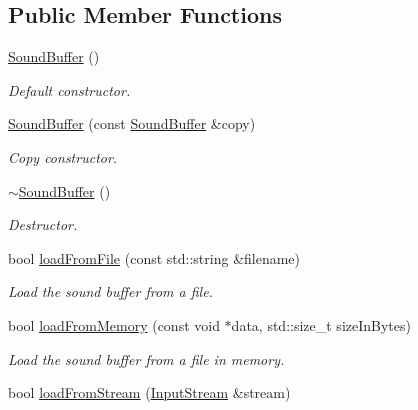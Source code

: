 \subsection*{Public Member Functions}
\begin{DoxyCompactItemize}
\item 
\mbox{\label{classsf_1_1_sound_buffer_a0cabfbfe19b831bf7d5c9592d92ef233}} 
\hyperlink{classsf_1_1_sound_buffer_a0cabfbfe19b831bf7d5c9592d92ef233}{Sound\+Buffer} ()
\begin{DoxyCompactList}\small\item\em Default constructor. \end{DoxyCompactList}\item 
\hyperlink{classsf_1_1_sound_buffer_aaf000fc741ff27015907e8588263f4a6}{Sound\+Buffer} (const \hyperlink{classsf_1_1_sound_buffer}{Sound\+Buffer} \&copy)
\begin{DoxyCompactList}\small\item\em Copy constructor. \end{DoxyCompactList}\item 
\mbox{\label{classsf_1_1_sound_buffer_aea240161724ffba74a0d6a9e277d3cd5}} 
\hyperlink{classsf_1_1_sound_buffer_aea240161724ffba74a0d6a9e277d3cd5}{$\sim$\+Sound\+Buffer} ()
\begin{DoxyCompactList}\small\item\em Destructor. \end{DoxyCompactList}\item 
bool \hyperlink{classsf_1_1_sound_buffer_a2be6a8025c97eb622a7dff6cf2594394}{load\+From\+File} (const std\+::string \&filename)
\begin{DoxyCompactList}\small\item\em Load the sound buffer from a file. \end{DoxyCompactList}\item 
bool \hyperlink{classsf_1_1_sound_buffer_af8cfa5599739a7edae69c5cba273d33f}{load\+From\+Memory} (const void $\ast$data, std\+::size\+\_\+t size\+In\+Bytes)
\begin{DoxyCompactList}\small\item\em Load the sound buffer from a file in memory. \end{DoxyCompactList}\item 
bool \hyperlink{classsf_1_1_sound_buffer_ad292156b1e01f6dabd4c0c277d5e079e}{load\+From\+Stream} (\hyperlink{classsf_1_1_input_stream}{Input\+Stream} \&stream)

\end{DoxyCompactItemize}

